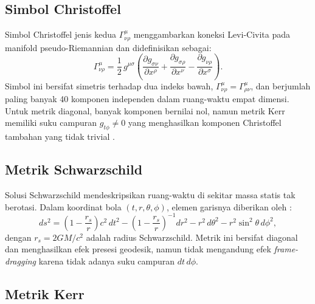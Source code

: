 \subsection{Simbol Christoffel}
\label{subsec:christoffel-umum}

Simbol Christoffel jenis kedua $\Gamma^\mu_{\nu\rho}$ menggambarkan koneksi Levi-Civita pada manifold pseudo-Riemannian dan didefinisikan sebagai:
\begin{equation}
    \Gamma^\mu_{\nu\rho} = \frac{1}{2}\, g^{\mu\sigma}
    \left(
        \frac{\partial g_{\sigma\nu}}{\partial x^\rho}
      + \frac{\partial g_{\sigma\rho}}{\partial x^\nu}
      - \frac{\partial g_{\nu\rho}}{\partial x^\sigma}
    \right).
    \label{eq:christoffel-def}
\end{equation}
Simbol ini bersifat simetris terhadap dua indeks bawah, $\Gamma^\mu_{\nu\rho} = \Gamma^\mu_{\rho\nu}$, dan berjumlah paling banyak 40 komponen independen dalam ruang-waktu empat dimensi. Untuk metrik diagonal, banyak komponen bernilai nol, namun metrik Kerr memiliki suku campuran $g_{t\phi} \neq 0$ yang menghasilkan komponen Christoffel tambahan yang tidak trivial \parencite{Carroll2004SpacetimeGeometry}.


\subsection{Metrik Schwarzschild}
\label{subsec:metrik-schwarzschild}

Solusi Schwarzschild mendeskripsikan ruang-waktu di sekitar massa statis tak berotasi. Dalam koordinat bola $(t, r, \theta, \phi)$, elemen garisnya diberikan oleh \parencite{Schwarzschild1916Field}:
\begin{equation}
    ds^2 = \left(1 - \frac{r_s}{r}\right) c^2\,dt^2
         - \left(1 - \frac{r_s}{r}\right)^{-1} dr^2
         - r^2\, d\theta^2
         - r^2 \sin^2\!\theta\, d\phi^2,
    \label{eq:schwarzschild}
\end{equation}
dengan $r_s = 2GM/c^2$ adalah radius Schwarzschild. Metrik ini bersifat diagonal dan menghasilkan efek presesi geodesik, namun tidak mengandung efek \textit{frame-dragging} karena tidak adanya suku campuran $dt\,d\phi$.


\subsection{Metrik Kerr}
\label{subsec:metrik-kerr}

